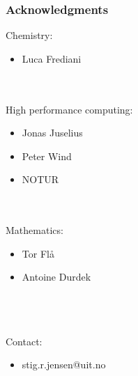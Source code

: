\documentclass[mathserif]{beamer}
\begin{document}
\begin{frame}
    \frametitle{Acknowledgments}
    Chemistry:
    \begin{itemize}
	\item Luca Frediani
    \end{itemize}
    \ \\
    \ \\
    High performance computing:
    \begin{itemize}
    	\item Jonas Juselius
    	\item Peter Wind
	\item NOTUR
    \end{itemize}
    \ \\
    \ \\
    Mathematics:
    \begin{itemize}
	\item Tor Fl\aa
	\item Antoine Durdek
    \end{itemize}
    \ \\
    \ \\
    \ \\
    Contact:
    \begin{itemize}
	\item stig.r.jensen@uit.no
    \end{itemize}
\end{frame}
\end{document}
